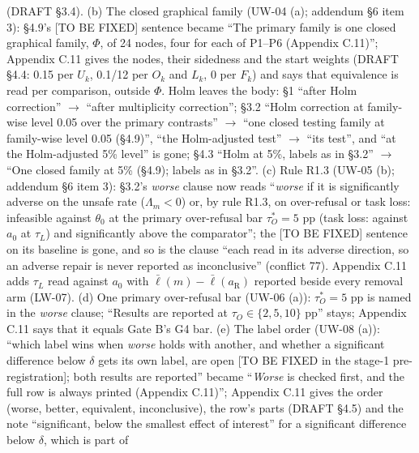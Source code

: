 \documentclass{article}
\theoremstyle{plain}
\theoremstyle{definition}
\theoremstyle{remark}
\begin{document}
\begin{itemize}
        (DRAFT \S{}3.4). (b) The closed graphical family (UW-04 (a); addendum
        \S{}6 item 3): \S{}4.9's [TO BE FIXED] sentence became ``The primary
        family is one closed graphical family, $\Phi$, of 24 nodes, four for
        each of P1--P6 (Appendix C.11)''; Appendix C.11 gives the nodes, their
        sidedness and the start weights (DRAFT \S{}4.4: 0.15 per $U_k$, 0.1/12
        per $O_k$ and $L_k$, 0 per $F_k$) and says that equivalence is read per
        comparison, outside $\Phi$. Holm leaves the body: \S{}1 ``after Holm
        correction'' $\to$ ``after multiplicity correction''; \S{}3.2 ``Holm
        correction at family-wise level 0.05 over the primary contrasts'' $\to$
        ``one closed testing family at family-wise level 0.05 (\S{}4.9)'', ``the
        Holm-adjusted test'' $\to$ ``its test'', and ``at the Holm-adjusted 5\%
        level'' is gone; \S{}4.3 ``Holm at 5\%, labels as in \S{}3.2'' $\to$
        ``One closed family at 5\% (\S{}4.9); labels as in \S{}3.2''. (c) Rule
        R1.3 (UW-05 (b); addendum \S{}6 item 3): \S{}3.2's \emph{worse} clause
        now reads ``\emph{worse} if it is significantly adverse on the unsafe
        rate ($\Lambda_m < 0$) or, by rule R1.3, on over-refusal or task loss:
        infeasible against $\theta_0$ at the primary over-refusal bar $\tau_O^*
        = 5$ pp (task loss: against $a_0$ at $\tau_L$) and significantly above
        the comparator''; the [TO BE FIXED] sentence on its baseline is gone,
        and so is the clause ``each read in its adverse direction, so an adverse
        repair is never reported as inconclusive'' (conflict 77). Appendix C.11
        adds $\tau_L$ read against $a_0$ with $\bar\ell(m) -
        \bar\ell(a_{\mathrm{R}})$ reported beside every removal arm (LW-07). (d)
        One primary over-refusal bar (UW-06 (a)): $\tau_O^* = 5$ pp is named in
        the \emph{worse} clause; ``Results are reported at $\tau_O \in \{2, 5,
        10\}$ pp'' stays; Appendix C.11 says that it equals Gate B's G4 bar. (e)
        The label order (UW-08 (a)): ``which label wins when \emph{worse} holds
        with another, and whether a significant difference below $\delta$ gets
        its own label, are open [TO BE FIXED in the stage-1 pre-registration];
        both results are reported'' became ``\emph{Worse} is checked first, and
        the full row is always printed (Appendix C.11)''; Appendix C.11 gives
        the order (worse, better, equivalent, inconclusive), the row's parts
        (DRAFT \S{}4.5) and the note ``significant, below the smallest effect of
        interest'' for a significant difference below $\delta$, which is part of

\end{itemize}
\end{document}
